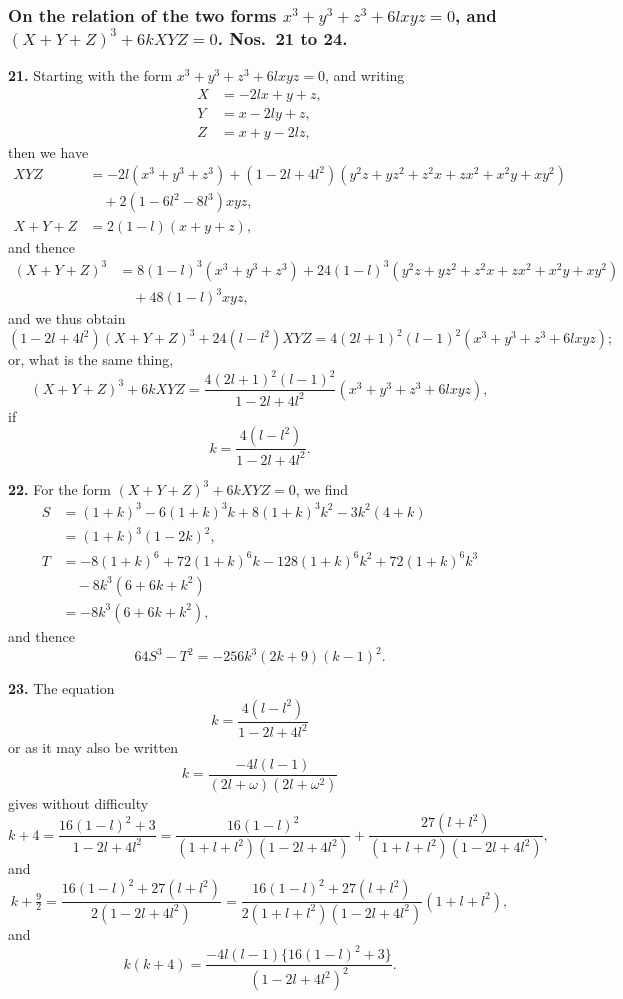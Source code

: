 \documentclass[11pt,a4paper]{article}
\theoremstyle{plain}
\begin{document}
\subsubsection*{On the relation of the two forms $x^3+y^3+z^3+6lxyz=0$, and $(X+Y+Z)^3+6kXYZ=0$. Nos.\ 21 to 24.}

\noindent\textbf{21.} Starting with the form $x^3+y^3+z^3+6lxyz=0$, and writing
\begin{align*}
X &= -2lx + y + z,\\
Y &= x - 2ly + z,\\
Z &= x + y - 2lz,
\end{align*}
then we have
\begin{align*}
XYZ &= -2l(x^3+y^3+z^3) + (1-2l+4l^2)(y^2z+yz^2+z^2x+zx^2+x^2y+xy^2)\\
&\quad + 2(1-6l^2-8l^3)xyz,\\
X+Y+Z &= 2(1-l)(x+y+z),
\end{align*}
and thence
\begin{align*}
(X+Y+Z)^3 &= 8(1-l)^3(x^3+y^3+z^3) + 24(1-l)^3(y^2z+yz^2+z^2x+zx^2+x^2y+xy^2)\\
&\quad + 48(1-l)^3xyz,
\end{align*}
and we thus obtain
\[
(1-2l+4l^2)(X+Y+Z)^3 + 24(l-l^2)XYZ = 4(2l+1)^2(l-1)^2(x^3+y^3+z^3+6lxyz);
\]
or, what is the same thing,
\[
(X+Y+Z)^3 + 6kXYZ = \frac{4(2l+1)^2(l-1)^2}{1-2l+4l^2}(x^3+y^3+z^3+6lxyz),
\]
if
\[
k = \frac{4(l-l^2)}{1-2l+4l^2}.
\]

\noindent\textbf{22.} For the form $(X+Y+Z)^3 + 6kXYZ = 0$, we find
\begin{align*}
S &= (1+k)^3 - 6(1+k)^3k + 8(1+k)^3k^2 - 3k^2(4+k) \\
&= (1+k)^3(1-2k)^2,\\
T &= -8(1+k)^6 + 72(1+k)^6k - 128(1+k)^6k^2 + 72(1+k)^6k^3 \\
&\quad - 8k^3(6+6k+k^2) \\
&= -8k^3(6+6k+k^2),
\end{align*}
and thence
\[
64S^3 - T^2 = -256k^3(2k+9)(k-1)^2.
\]

\noindent\textbf{23.} The equation
\[
k = \frac{4(l-l^2)}{1-2l+4l^2}
\]
or as it may also be written
\[
k = \frac{-4l(l-1)}{(2l+\omega)(2l+\omega^2)}
\]
gives without difficulty
\[
k+4 = \frac{16(1-l)^2+3}{1-2l+4l^2} = \frac{16(1-l)^2}{(1+l+l^2)(1-2l+4l^2)} + \frac{27(l+l^2)}{(1+l+l^2)(1-2l+4l^2)},
\]
and
\[
k+\tfrac{9}{2} = \frac{16(1-l)^2+27(l+l^2)}{2(1-2l+4l^2)} = \frac{16(1-l)^2+27(l+l^2)}{2(1+l+l^2)(1-2l+4l^2)}(1+l+l^2),
\]
and
\[
k(k+4) = \frac{-4l(l-1)\{16(1-l)^2+3\}}{(1-2l+4l^2)^2}.
\]
\end{document}
